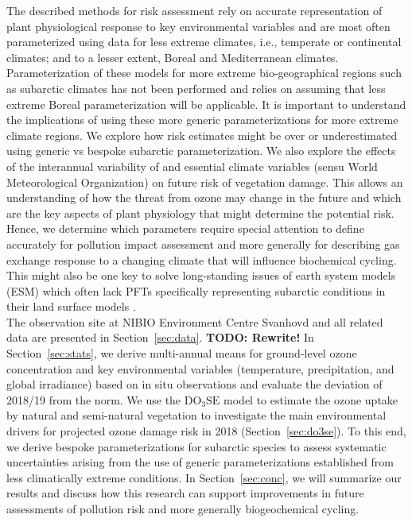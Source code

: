 \documentclass[bg, manuscript]{copernicus}
\begin{document}
The described methods for risk assessment rely on accurate representation of plant physiological response to key environmental variables and are most often parameterized using data for less extreme climates, i.e., temperate or continental climates; and to a lesser extent, Boreal and Mediterranean climates. Parameterization of these models for more extreme bio-geographical regions such as subarctic climates has not been performed and relies on assuming that less extreme Boreal parameterization will be applicable. It is important to understand the implications of using these more generic parameterizations for more extreme climate regions. We explore how risk estimates might be over or underestimated using generic vs bespoke subarctic parameterization. We also explore the effects of the interannual variability of \chem{[O_3]} and essential climate variables (sensu World Meteorological Organization) on future risk of vegetation damage.
This allows an understanding of how the threat from ozone may change in the future and which are the key aspects of plant physiology that might determine the potential risk. Hence, we determine which parameters require special attention to define accurately for pollution impact assessment and more generally for describing gas exchange response to a changing climate that will influence biochemical cycling. This might also be one key to solve long-standing issues of earth system models (ESM) which often lack PFTs specifically representing subarctic conditions in their land surface models \citep{GMD:Poulter2015,JAMES:Lawrence2019}.\\

The observation site at NIBIO Environment Centre Svanhovd and all related data are presented in Section~\ref{sec:data}. \textbf{TODO: Rewrite!} In Section~\ref{sec:stats}, we derive multi-annual means for ground-level ozone concentration and key environmental variables (temperature, precipitation, and global irradiance) based on in situ observations and evaluate the deviation of 2018/19 from the norm. We use the $\mathrm{DO_3SE}$ model to estimate the ozone uptake by natural and semi-natural vegetation to investigate the main environmental drivers for projected ozone damage risk in 2018 (Section~\ref{sec:do3se}). To this end, we derive bespoke parameterizations for subarctic species to assess systematic uncertainties arising from the use of generic parameterizations established from less climatically extreme conditions. In Section~\ref{sec:conc}, we will summarize our results and discuss how this research can support improvements in future assessments of pollution risk and more generally biogeochemical cycling.
\end{document}
